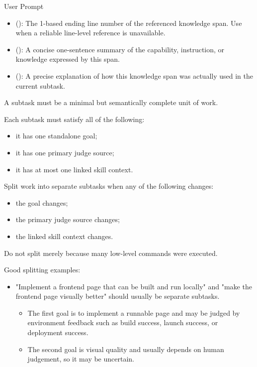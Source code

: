 \begin{svpromptbox}{User Prompt}
\begin{itemize}
\item {} (): The 1-based ending line number of the referenced knowledge span. Use  when a reliable line-level reference is unavailable.
\item {} (): A concise one-sentence summary of the capability, instruction, or knowledge expressed by this span.
\item {} (): A precise explanation of how this knowledge span was actually used in the current subtask.
\end{itemize}
\smallskip
{}
\smallskip
{}
\smallskip
A subtask must be a minimal but semantically complete unit of work.\par
\smallskip
Each subtask must satisfy all of the following:\par
\smallskip
\begin{itemize}
\item it has one standalone goal;
\item it has one primary judge source;
\item it has at most one linked skill context.
\end{itemize}
\smallskip
Split work into separate subtasks when any of the following changes:\par
\smallskip
\begin{itemize}
\item the goal changes;
\item the primary judge source changes;
\item the linked skill context changes.
\end{itemize}
\smallskip
Do not split merely because many low-level commands were executed.\par
\smallskip
Good splitting examples:\par
\smallskip
\begin{itemize}
\item "Implement a frontend page that can be built and run locally" and "make the frontend page visually better" should usually be separate subtasks.
\begin{itemize}
\item The first goal is to implement a runnable page and may be judged by environment feedback such as build success, launch success, or deployment success.
\item The second goal is visual quality and usually depends on human judgement, so it may be uncertain.

\end{itemize}
\end{itemize}
\end{svpromptbox}
